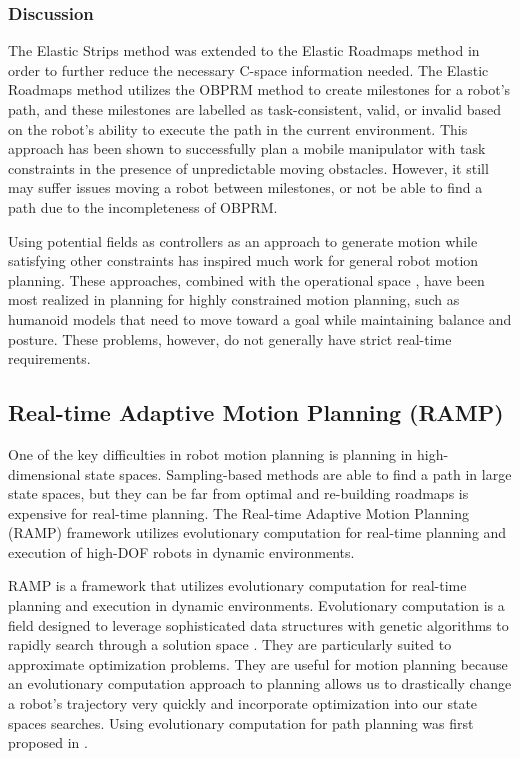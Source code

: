 \documentclass[10pt,conference]{ieeeconf}
\begin{document}
\subsubsection{Discussion}

The Elastic Strips method was extended to the Elastic Roadmaps method \cite{yang2009elastic} in order to further reduce the necessary C-space information needed. The Elastic Roadmaps method utilizes the OBPRM method to create milestones for a robot's path, and these milestones are labelled as task-consistent, valid, or invalid based on the robot's ability to execute the path in the current environment. This approach has been shown to successfully plan a mobile manipulator with task constraints in the presence of unpredictable moving obstacles. However, it still may suffer issues moving a robot between milestones, or not be able to find a path due to the incompleteness of OBPRM.

Using potential fields as controllers as an approach to generate motion while satisfying other constraints has inspired much work for general robot motion planning. These approaches, combined with the operational space \cite{khatib1987unified}, have been most realized in planning for highly constrained motion planning, such as humanoid models that need to move toward a goal while maintaining balance and posture. These problems, however, do not generally have strict real-time requirements.

\subsection{Real-time Adaptive Motion Planning (RAMP)}
	
		
One of the key difficulties in robot motion planning is planning in high-dimensional state spaces. Sampling-based methods are able to find a path in large state spaces, but they can be far from optimal and re-building roadmaps is expensive for real-time planning. The Real-time Adaptive Motion Planning (RAMP) \cite{RAMP} framework utilizes evolutionary computation for real-time planning and execution of high-DOF robots in dynamic environments.


RAMP is a framework that utilizes evolutionary computation for real-time planning and execution in dynamic environments. Evolutionary computation is a field designed to leverage sophisticated data structures with genetic algorithms to rapidly search through a solution space \cite{michalewicz2013genetic}. They are particularly suited to approximate optimization problems. They are useful for motion planning because an evolutionary computation approach to planning allows us to drastically change a robot's trajectory very quickly and incorporate optimization into our state spaces searches. Using evolutionary computation for path planning was first proposed in \cite{EPN_Adaptive}. 
\end{document}
